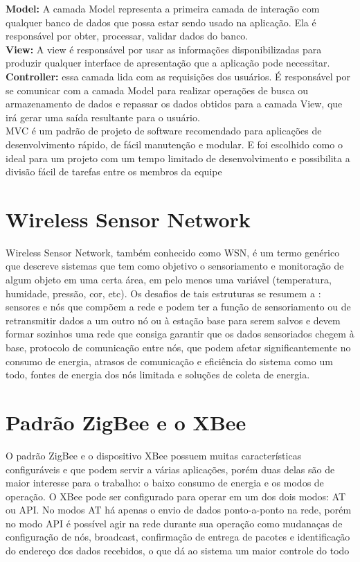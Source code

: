 \textbf{Model:} A camada Model representa a primeira camada de interação com qualquer banco de dados que possa estar sendo usado na aplicação. Ela é responsável por obter, processar, validar dados do banco.\\
\textbf{View:} A view é responsável por usar as informações disponibilizadas para produzir qualquer interface de apresentação que a aplicação pode necessitar.\\
\textbf{Controller:} essa camada lida com as requisições dos usuários. É responsável por se comunicar com a camada Model para realizar operações de busca ou armazenamento de dados e repassar os dados obtidos para a camada View, que irá gerar uma saída resultante para o usuário.\\
MVC é um padrão de projeto de software recomendado para aplicações de desenvolvimento rápido, de fácil manutenção e modular. E foi escolhido como o ideal para um projeto com um tempo limitado de desenvolvimento e possibilita a divisão fácil de tarefas entre os membros da equipe

\section{Wireless Sensor Network }
\label{Sec:WSN}
Wireless Sensor Network, também conhecido como WSN, é um termo genérico que descreve sistemas que tem como objetivo o sensoriamento e monitoração de algum objeto em uma certa área, em pelo menos uma variável (temperatura, humidade, pressão, cor, etc). Os desafios de tais estruturas se resumem a \citet{WSN_survey_JYBMDG_article}: sensores e nós que compõem a rede e podem ter a função de sensoriamento ou de retransmitir dados a um outro nó ou à estação base para serem salvos e devem formar sozinhos uma rede que consiga garantir que os dados sensoriados chegem à base, protocolo de comunicação entre nós, que podem afetar significantemente no consumo de energia, atrasos de comunicação e eficiência do sistema como um todo, fontes de energia dos nós limitada e soluções de coleta de energia. 

\section{Padrão ZigBee e o XBee}
\label{Sec:ZigBee_XBee}
 O padrão ZigBee e o dispositivo XBee possuem muitas características configuráveis e que podem servir a várias aplicações\citet{xbee_book}, porém duas delas são de maior interesse para o trabalho: o baixo consumo de energia e os modos de operação. O XBee pode ser configurado para operar em um dos dois modos: AT ou API. No modos AT há apenas o envio de dados ponto-a-ponto na rede, porém no modo API é possível agir na rede durante sua operação como mudanaças de configuração de nós, broadcast, confirmação de entrega de pacotes e identificação do endereço dos dados recebidos, o que dá ao sistema um maior controle do todo \citet{xbee_documentation}
 
